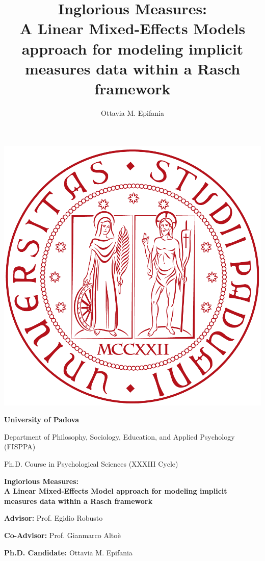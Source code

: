\documentclass[12pt]{book}
\title{Inglorious Measures: \\ A Linear Mixed-Effects Models approach for modeling implicit measures data within a Rasch framework}
\author{Ottavia M. Epifania}
\begin{document}
	
	
	\frontmatter
	
	\thispagestyle{empty}
	
	\begin{center}
		\includegraphics[width=0.25\linewidth]{unipd.png}
	\end{center}
	
	\begin{center}
		\begin{Large}
			\textbf{University of Padova}
			
			Department of Philosophy, Sociology, Education, and Applied Psychology (FISPPA)
		\end{Large}
		
	\end{center}
	
	\vspace{3mm}
	\begin{center}
		\begin{large}
			Ph.D. Course in Psychological Sciences (XXXIII Cycle)
		\end{large}
		
		\begin{huge}
			\bfseries
			Inglorious Measures: \\ A Linear Mixed-Effects Model approach for modeling implicit measures data within a Rasch framework
		\end{huge}
		
		
	\end{center}
	
	\vspace{2cm}
	\begin{multicols}{2}
		\begin{flushleft}
				\textbf{Advisor:} Prof. Egidio Robusto
				
				\textbf{Co-Advisor:} Prof. Gianmarco Altoè
			
		\end{flushleft}
		\columnbreak
		\begin{flushright}
			\vspace{1.5cm}
			
				\textbf{Ph.D. Candidate:} Ottavia M. Epifania 
			
		\end{flushright}
		
	\end{multicols}
\end{document}
